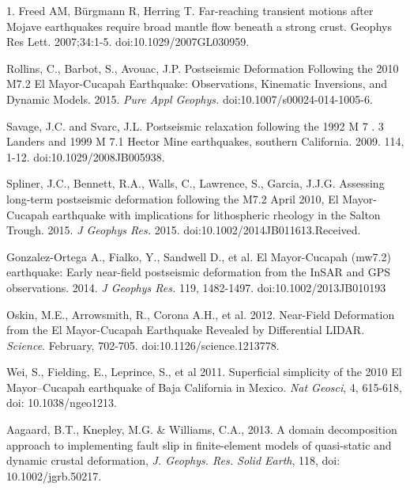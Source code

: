 \documentclass[12pt]{article}
\begin{document}
\begin{thebibliography}{}

 1. Freed AM, Bürgmann R, Herring
  T. Far-reaching transient motions after Mojave earthquakes require
  broad mantle flow beneath a strong crust. Geophys Res
  Lett. 2007;34:1-5. doi:10.1029/2007GL030959.

 Rollins, C., Barbot, S.,
  Avouac, J.P. Postseismic Deformation Following the 2010 M7.2 El
  Mayor-Cucapah Earthquake: Observations, Kinematic Inversions, and
  Dynamic Models. 2015. \textit{Pure Appl Geophys.}
  doi:10.1007/s00024-014-1005-6.

 Savage, J.C. and Svarc,
  J.L. Postseismic relaxation following the 1992 M 7 . 3 Landers and
  1999 M 7.1 Hector Mine earthquakes, southern California. 2009. 114,
  1-12. doi:10.1029/2008JB005938.

 Spliner, J.C., Bennett, R.A.,
  Walls, C., Lawrence, S., Garcia, J.J.G. Assessing long-term
  postseismic deformation following the M7.2 April 2010, El
  Mayor-Cucapah earthquake with implications for lithospheric rheology
  in the Salton Trough. 2015. \textit{J Geophys Res.}
  2015. doi:10.1002/2014JB011613.Received.

 Gonzalez-Ortega A.,
  Fialko, Y., Sandwell D., et al. El Mayor-Cucapah (mw7.2) earthquake:
  Early near-field postseismic deformation from the InSAR and GPS
  observations. 2014. \textit{J Geophys Res.} 119,
  1482-1497. doi:10.1002/2013JB010193

 Oskin, M.E., Arrowsmith, R.,
  Corona A.H., et al. 2012. Near-Field Deformation from the El
  Mayor-Cucapah Earthquake Revealed by Differential
  LIDAR. \textit{Science}. February,
  702-705. doi:10.1126/science.1213778.

 Wei, S., Fielding, E., Leprince,
  S., et al 2011. Superficial simplicity of the 2010 El Mayor–Cucapah
  earthquake of Baja California in Mexico. \textit{Nat
  Geosci}, 4, 615-618, doi: 10.1038/ngeo1213.

 Aagaard, B.T., Knepley, M.G. \&
  Williams, C.A., 2013. A domain decomposition approach to
  implementing fault slip in finite-element models of quasi-static and
  dynamic crustal deformation, \textit{J. Geophys.  Res. Solid Earth},
  118, doi: 10.1002/jgrb.50217.

\end{thebibliography}
\end{document}
